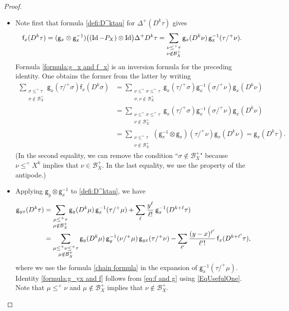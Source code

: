 \documentclass[JEP,XML,SOM,Unicode,published]{cedram}
\theoremstyle{plain}
\theoremstyle{definition}
\DeclareMathOperator{\iden}{Id}
\newcommand{\sff}{\mathsf{f}}
\newcommand{\sfg}{\mathsf{g}}
\newcommand{\mcB}{\mathcal{B}}
\begin{document}
\begin{proof}
\begin{itemize}
\item
Note first that formula \eqref{defi:D^ktau} for $\Delta^+(D^k\tau)$ gives
\begin{equation} \label{EqUsefulOne}
{\sff}_x(D^k\tau) = ({\sf g}_x\otimes {\sf g}_x^{-1})\bigl((\iden-P_X)\otimes\iden\bigr)\Delta^+D^k\tau = \sum_{\substack{\nu\leq^+\tau\\ \nu\notin\mcB_X^+}} {\sfg}_x(D^k\nu)\,{\sfg}_x^{-1}(\tau/^+\nu).
\end{equation}
Formula \eqref{formula:g_x and f_x} is an inversion formula for the preceding identity. One obtains the former from the latter by writing
\begin{align*}
\sum_{\substack{\sigma\leq^+\tau\\\sigma\notin\mcB_X^+}}\sfg_x(\tau/^+\sigma)\sff_x(D^k\sigma) &= \sum_{\substack{\nu\le^+\sigma\le^+\tau\\\sigma,\nu\notin\mcB_X^+}} \sfg_x(\tau/^+\sigma)\sfg_x^{-1}(\sigma/^+\nu)\sfg_x(D^k\nu) \\
&= \sum_{\substack{\nu\le^+\sigma\le^+\tau\\\nu\notin\mcB_X^+}} \sfg_x(\tau/^+\sigma)\sfg_x^{-1}(\sigma/^+\nu)\sfg_x(D^k\nu) \\
&= \sum_{\substack{\nu\le^+\tau\\\nu\notin\mcB_X^+}}(\sfg_x^{-1}\otimes\sfg_x)(\tau/^+\nu)\sfg_x(D^k\nu)= \sfg_x(D^k\tau).
\end{align*}
(In the second equality, we can remove the condition ``$\sigma\notin\mcB_X^+$" because $\nu\le^+X^k$ implies that $\nu\in\mcB_X^+$. In the last equality, we use the property of the antipode.)

\item
Applying $\sfg_y\otimes\sfg_x^{-1}$ to \eqref{defi:D^ktau}, we have
\begin{align}\label{eq:f and g}
\sfg_{yx}(D^k\tau)
&= \sum_{\substack{\mu\le^+\tau\\\mu\notin\mcB_X^+}} \sfg_y(D^k\mu)\,\sfg_x^{-1}(\tau/^+\mu) + \sum_\ell\frac{y^\ell}{\ell!}\,\sfg_x^{-1}(D^{k+\ell}\tau)\notag \\[-15pt] \\[-5pt]
&= \sum_{\substack{\mu\le^+\nu\le^+\tau\\\mu\notin\mcB_X^+}} \sfg_y(D^k\mu)\,\sfg_y^{-1}(\nu/^+\mu)\,\sfg_{yx}(\tau/^+\nu) - \sum_{\ell'}\frac{(y-x)^{\ell'}}{\ell'!}\,\sff_x(D^{k+\ell'}\tau),\notag
\end{align}
where we use the formula \eqref{chain formula} in the expansion of $\sfg_x^{-1}(\tau/^+\mu)$. Identity \eqref{formula:g_yx and f} follows from \eqref{eq:f and g} using \eqref{EqUsefulOne}. Note that $\mu\le^+\nu$ and $\mu\notin\mcB_X^+$ implies that $\nu\notin\mcB_X^+$.


\end{itemize}
\end{proof}
\end{document}
